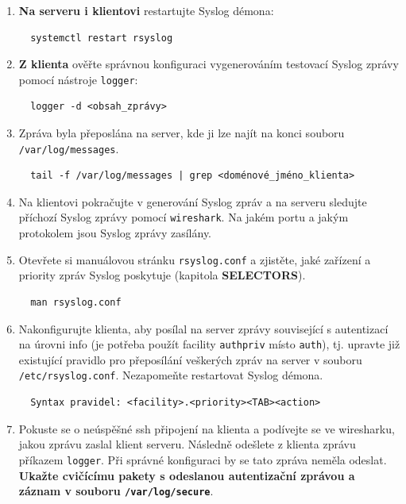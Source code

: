 \begin{itemize}
\begin{enumerate}
            \item {\bf Na serveru i klientovi} restartujte Syslog démona: 
\begin{verbatim}
  systemctl restart rsyslog
\end{verbatim} 

            \item {\bf Z klienta} ověřte správnou konfiguraci vygenerováním testovací Syslog 
         zprávy pomocí nástroje {\tt logger}:
\begin{verbatim} 
  logger -d <obsah_zprávy>
\end{verbatim} 
        
            \item Zpráva byla přeposlána na server, kde ji lze najít na konci souboru
         {\tt /var/log/messages}.

\begin{verbatim} 
  tail -f /var/log/messages | grep <doménové_jméno_klienta>
\end{verbatim} 

            \item  Na klientovi pokračujte v generování Syslog zpráv a 
         na serveru sledujte příchozí Syslog zprávy pomocí {\tt wireshark}. Na jakém
         portu a jakým protokolem jsou Syslog zprávy zasílány.      

            \item Otevřete si manuálovou stránku {\tt rsyslog.conf} a zjistěte, jaké zařízení a priority
         zpráv Syslog poskytuje (kapitola {\bf SELECTORS}). 
\begin{verbatim} 
  man rsyslog.conf
\end{verbatim} 
        
         \item Nakonfigurujte klienta, aby posílal na server zprávy související s autentizací na úrovni info (je potřeba použít facility
         {\tt authpriv} místo {\tt auth}), tj. upravte již existující pravidlo pro přeposílání veškerých zpráv na server v souboru 
         {\tt /etc/rsyslog.conf}. Nezapomeňte restartovat Syslog démona.
         
\begin{verbatim} 
  Syntax pravidel: <facility>.<priority><TAB><action>
\end{verbatim} 
         \item Pokuste se o neúspěšné ssh připojení na klienta a podívejte se ve wiresharku, jakou zprávu zaslal klient serveru. Následně odešlete z klienta zprávu příkazem {\tt logger}. Při správné konfiguraci by se tato zpráva neměla odeslat. {\bf Ukažte cvičícímu pakety s odeslanou autentizační zprávou a záznam v souboru {\tt /var/log/secure}}.

       \end{enumerate}
   \end{itemize}

